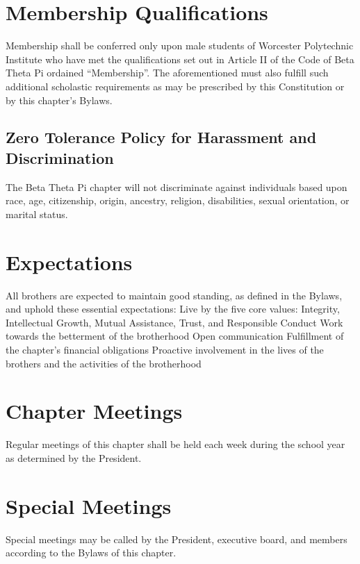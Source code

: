 
\section{Membership Qualifications}

Membership shall be conferred only upon male students of Worcester Polytechnic Institute who have met the qualifications set out in Article II of the Code of Beta Theta Pi ordained “Membership”.
The aforementioned must also fulfill such additional scholastic requirements as may be prescribed by this Constitution or by this chapter’s Bylaws.


\subsection{Zero Tolerance Policy for Harassment and Discrimination} 

The Beta Theta Pi chapter will not discriminate against individuals based upon race, age, citizenship, origin, ancestry, religion, disabilities, sexual orientation, or marital status.

\section{Expectations}

All brothers are expected to maintain good standing, as defined in the Bylaws, and uphold these essential expectations:
Live by the five core values: Integrity, Intellectual Growth, Mutual Assistance, Trust, and Responsible Conduct
Work towards the betterment of the brotherhood
Open communication
Fulfillment of the chapter’s financial obligations
Proactive involvement in the lives of the brothers and the activities of the brotherhood

\section{Chapter Meetings}

Regular meetings of this chapter shall be held each week during the school year as determined by the President.

\section{Special Meetings}

Special meetings may be called by the President, executive board, and members according to the Bylaws of this chapter.

